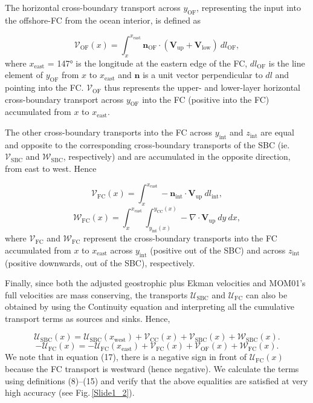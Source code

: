 \documentclass[preprint,3p,review,12pt]{elsarticle}
\renewcommand{\Vec}[1]{\mathbf{#1}}
\newcommand{\sub}[1]{_{\text{#1}}}
\begin{document}
The horizontal cross-boundary transport across $y\sub{OF}$, representing the input into the offshore-FC from the ocean interior, is defined as

\begin{equation} \label{eq:8}
\mathcal{V}\sub{OF}(x) = \int_{x}^{x\sub{east}}\Vec{n}\sub{OF}\cdot(\Vec{V}\sub{up} + \Vec{V}\sub{low})\ dl\sub{OF},
\end{equation}
%
where $x\sub{east}$ = \ang{147} is the longitude at the eastern edge of the FC, $dl\sub{OF}$ is the line element of $y\sub{OF}$ from $x$ to $x\sub{east}$ and $\Vec{n}$ is a unit vector perpendicular to $dl$ and pointing into the FC\@. $\mathcal{V}\sub{OF}$ thus represents the upper- and lower-layer horizontal cross-boundary transport across $y\sub{OF}$ into the FC (positive into the FC) accumulated from $x$ to $x\sub{east}$. 

The other cross-boundary transports into the FC across $y\sub{int}$ and $z\sub{int}$ are equal and opposite to the corresponding cross-boundary transports of the SBC (ie. $\mathcal{V}\sub{SBC}$ and $\mathcal{W}\sub{SBC}$, respectively) and are accumulated in the opposite direction, from east to west. Hence

\begin{equation} \label{eq:9}
\mathcal{V}\sub{FC}(x) = \int_{x}^{x\sub{east}}-\Vec{n}\sub{int}\cdot\Vec{V}\sub{up}\ dl\sub{int},
\end{equation}
%
\begin{equation} \label{eq:10}
\mathcal{W}\sub{FC}(x) = \int_{x}^{x\sub{east}} \int_{y\sub{int}(x)}^{y\sub{CC}(x)} -\nabla\cdot\Vec{V}\sub{up}\ dy\ dx,
\end{equation}
%
where $\mathcal{V}\sub{FC}$ and $\mathcal{W}\sub{FC}$ represent the cross-boundary transports into the FC accumulated from $x$ to $x\sub{east}$ across $y\sub{int}$ (positive out of the SBC) and across $z\sub{int}$ (positive downwards, out of the SBC), respectively.

Finally, since both
the adjusted geostrophic plus Ekman velocities and MOM01's full velocities are mass conserving, the transports $\mathcal{U}\sub{SBC}$ and $\mathcal{U}\sub{FC}$ can also be obtained by using the Continuity equation and interpreting all the cumulative transport terms as sources and sinks. Hence,

\begin{equation} \label{eq:11}
\mathcal{U}\sub{SBC}(x) = \mathcal{U}\sub{SBC}(x\sub{west}) + \mathcal{V}\sub{CC}(x) + \mathcal{V}\sub{SBC}(x) + \mathcal{W}\sub{SBC}(x).
\end{equation}
%
\begin{equation} \label{eq:12}
-\mathcal{U}\sub{FC}(x) = -\mathcal{U}\sub{FC}(x\sub{east}) + \mathcal{V}\sub{FC}(x) + \mathcal{V}\sub{OF}(x) + \mathcal{W}\sub{FC}(x).
\end{equation}
%
We note that in equation (17), there is a negative sign in front of $\mathcal{U}\sub{FC}(x)$ because the FC transport is westward (hence negative). We calculate the terms using definitions (8)--(15)
and verify that the above equalities are satisfied at
very high accuracy (see Fig.\,\ref{Slide1_2}).
\end{document}
